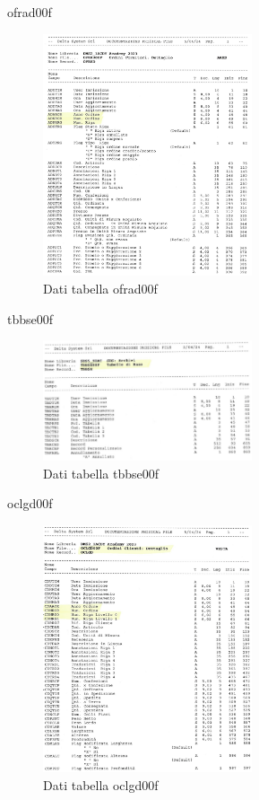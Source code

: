 \documentclass[target=bach,aauheader=,style=]{thud}
\begin{document}
ofrad00f
\begin{figure}[H]
    \begin{center}
        \includegraphics[width=0.55\textwidth]{database/ofrad00f.jpg}
    \end{center}
    \caption{Dati tabella ofrad00f}
\end{figure}
tbbse00f
\begin{figure}[H]
    \begin{center}
        \includegraphics[width=0.55\textwidth]{database/tbbse00f.jpg}
    \end{center}
    \caption{Dati tabella tbbse00f}
\end{figure}
oclgd00f
\begin{figure}[H]
    \begin{center}
        \includegraphics[width=0.55\textwidth]{database/oclgd00f.jpg}
    \end{center}
    \caption{Dati tabella oclgd00f}
\end{figure}
\end{document}

